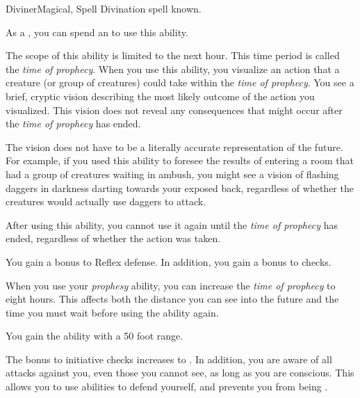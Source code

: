     \begin{feat}{Diviner}{Magical, Spell}
        \featpre Divination spell known.
        \featben

         As a , you can spend an  to use this ability.
        \begin{ability}
            \begin{spelleffects}
                \spellspecial The scope of this ability is limited to the next hour.
                This time period is called the \textit{time of prophecy}.
                When you use this ability, you visualize an action that a creature (or group of creatures) could take within the \textit{time of prophecy}.
                \spelleffect You see a brief, cryptic vision describing the most likely outcome of the action you visualized.
                This vision does not reveal any consequences that might occur after the \textit{time of prophecy} has ended.

                The vision does not have to be a literally accurate representation of the future.
                For example, if you used this ability to foresee the results of entering a room that had a group of creatures waiting in ambush, you might see a vision of flashing daggers in darkness darting towards your exposed back, regardless of whether the creatures would actually use daggers to attack.

                After using this ability, you cannot use it again until the \textit{time of prophecy} has ended, regardless of whether the action was taken.
            \end{spelleffects}
        \end{ability}

         You gain a  bonus to Reflex defense.
        In addition, you gain a  bonus to  checks.

         When you use your \textit{prophesy} ability, you can increase the \textit{time of prophecy} to eight hours.
        This affects both the distance you can see into the future and the time you must wait before using the ability again.

         You gain the  ability with a 50 foot range.

         The bonus to initiative checks increases to .
        In addition, you are aware of all attacks against you, even those you cannot see, as long as you are conscious.
        This allows you to use abilities to defend yourself, and prevents you from being \unaware.


\end{feat}
